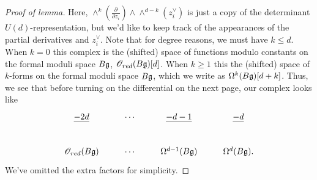 \begin{proof}[Proof of lemma]
Here, $\wedge^{k}\left(\frac{\partial}{\partial z_i}\right) \wedge \wedge^{d-k}\left(z_i^\vee\right)$ is just a copy of the determinant $U(d)$-representation, but we'd like to keep track of the appearances of the partial derivatives and $z_i^\vee$. 
Note that for degree reasons, we must have $k \leq d$. 
When $k = 0$ this complex is the (shifted) space of functions modulo constants on the formal moduli space $B\mathfrak g$, $\mathscr O_{red}(B\mathfrak g)[d]$. 
When $k \geq 1$ this the (shifted) space of $k$-forms on the formal moduli space $B\mathfrak g$, which we write as $\Omega^{k}(B \mathfrak g)[d+k]$.
Thus, we see that before turning on the differential on the next page, our complex looks like
\[
\label{bg def complex1}
\xymatrix{
\ul{-2d} & \cdots & \ul{-d-1} & \ul{-d} \\
\sO_{red}(B \fg) & \cdots & \Omega^{d-1} (B \fg) & \Omega^{d}(B \fg) .
}
\]
We've omitted the extra factors for simplicity. 
\end{proof}

